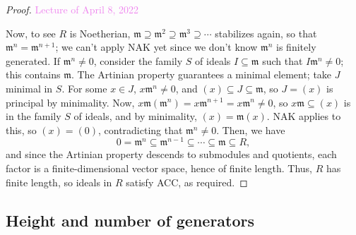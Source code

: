 \documentclass{amsart}[12pt]
\newcommand{\Apr}[1]{\textcolor{violet}{Lecture of April #1, 2022}}
\newcommand{\m}{{\mathfrak m}}
\numberwithin{equation}{section}
\theoremstyle{plain} %
\theoremstyle{definition}
\theoremstyle{remark}
\begin{document}
\begin{proof}
	\Apr{8}
	
	Now, to see $R$ is Noetherian, $\m \supseteq \m^2 \supseteq \m^3 \supseteq \cdots$ stabilizes again, so that $\m^n=\m^{n+1}$; we can't apply NAK yet since we don't know $\m^n$ is finitely generated. If $\m^n\neq 0$, consider the family $S$ of ideals $I\subseteq \m$ such that $I \m^n \neq 0$; this contains $\m$. The Artinian property guarantees a minimal element; take $J$ minimal in $S$. For some $x\in J$, $x\m^n \neq 0$, and $(x) \subseteq J \subseteq \m$, so $J=(x)$ is principal by minimality. Now, $x\m (\m^n) = x \m^{n+1} = x \m^n \neq 0$, so $x \m \subseteq (x)$ is in the family $S$ of ideals, and by minimality, $(x) = \m(x)$. NAK applies to this, so $(x)=(0)$, contradicting that $\m^n\neq 0$. Then, we have 
	\[ 0 = \m^n \subseteq \m^{n-1} \subseteq \cdots \subseteq \m \subseteq R,\]
	and since the Artinian property descends to submodules and quotients, each factor is a finite-dimensional vector space, hence of finite length. Thus, $R$ has finite length, so ideals in $R$ satisfy ACC, as required.
\end{proof}



\subsection{Height and number of generators}
\end{document}
